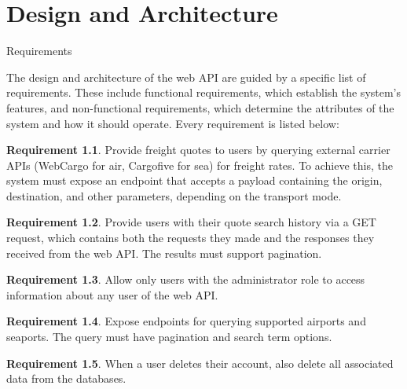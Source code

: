 \documentclass[12pt,reqno, oneside]{amsbook}
\makeatletter
\def\section{\@startsection{section}{1}%
      \z@{.5\linespacing\@plus.7\linespacing}{.25\linespacing}%
      {\normalfont\bfseries\flushleft}}
\theoremstyle{definition}
\theoremstyle{definition}
\newtheorem{requirement}{Requirement}
\numberwithin{section}{chapter}
\numberwithin{table}{chapter}
\numberwithin{figure}{chapter}
\makeatother
\begin{document}
\chapter{Design and Architecture}
\label{Chapter:Design_And_Architecture}

\section{Requirements}
\label{Section:Requirements}

The design and architecture of the web \ac{API} are guided by a specific list of requirements. These include functional requirements, which establish the system's features, and non-functional requirements, which determine the attributes of the system and how it should operate. Every requirement is listed below:

\begin{requirement}
  \label{Requirement:1}
  Provide freight quotes to users by querying external carrier \acp{API} (WebCargo for air, Cargofive for sea) for freight rates. To achieve this, the system must expose an endpoint that accepts a payload containing the origin, destination, and other parameters, depending on the transport mode.
\end{requirement}

\begin{requirement}
  \label{Requirement:2}
  Provide users with their quote search history via a GET request, which contains both the requests they made and the responses they received from the web \ac{API}. The results must support pagination.
\end{requirement}

\begin{requirement}
  \label{Requirement:3}
  Allow only users with the administrator role to access information about any user of the web \ac{API}.
\end{requirement}

\begin{requirement}
  \label{Requirement:4}
  Expose endpoints for querying supported airports and seaports. The query must have pagination and search term options.
\end{requirement}

\begin{requirement}
  \label{Requirement:5}
  When a user deletes their account, also delete all associated data from the databases.
\end{requirement}
\end{document}

